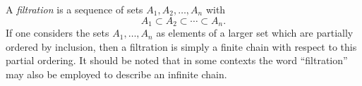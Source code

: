 \documentclass[12pt]{article}
\begin{document}
A {\em filtration} is a sequence of sets $A_1, A_2, \dots, A_n$ with
$$
A_1 \subset A_2 \subset \cdots \subset A_n.
$$
If one considers the sets $A_1, \dots, A_n$ as elements of a larger set which are partially ordered by inclusion, then a filtration is simply a finite chain with respect to this partial ordering. It should be noted that in some contexts the word ``filtration'' may also be employed to describe an infinite chain.
\end{document}
